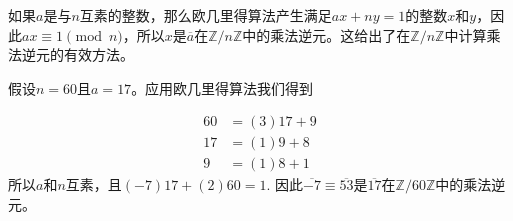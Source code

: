 如果$a$是与$n$互素的整数，那么欧几里得算法产生满足$ax + ny = 1$的整数$x$和$y$，因此$ax \equiv 1 \pmod{n}$，所以$x$是$\overline{a}$在$\mathbb{Z}/n\mathbb{Z}$中的乘法逆元。这给出了在$\mathbb{Z}/n\mathbb{Z}$中计算乘法逆元的有效方法。

\begin{example}
假设$n = 60$且$a = 17$。应用欧几里得算法我们得到

\[
\begin{aligned}
60 &= (3)17 + 9\\ 17 &= (1)9 + 8 \\ 9 &= (1)8 + 1
\end{aligned}
\]
所以$a$和$n$互素，且$(-7)17 + (2)60 = 1$. 
因此$\overline{-7} \equiv \overline{53}$是$\overline{17}$在$\mathbb{Z}/60\mathbb{Z}$中的乘法逆元。
\end{example}



